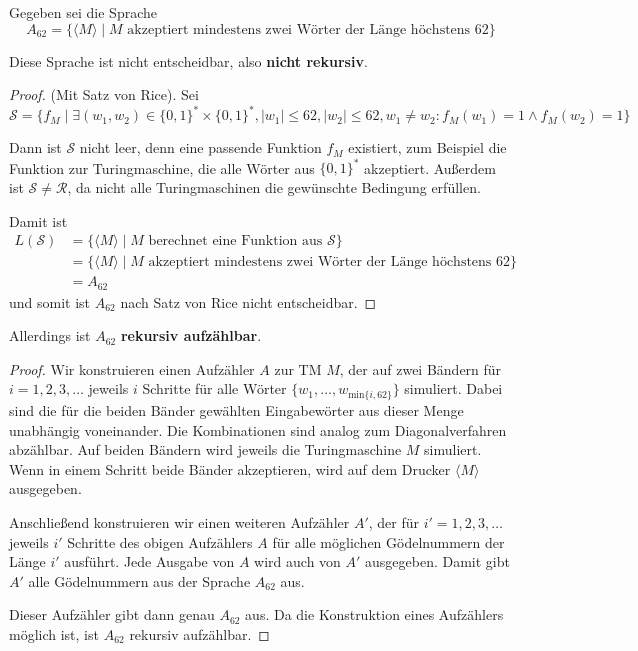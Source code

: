 Gegeben sei die Sprache
\[
A_{62} = \{\langle M \rangle \mid M \text{ akzeptiert mindestens zwei Wörter der
	Länge höchstens } 62 \}
\]

Diese Sprache ist nicht entscheidbar, also \textbf{nicht rekursiv}.

\begin{proof}
	(Mit Satz von Rice). Sei 
\[
\mathcal{S} = \{f_M \mid \exists (w_1, w_2) \in \{0,1\}^* \times \{0,1\}^*,
	|w_1| \leq 62, |w_2| \leq 62, w_1 \neq w_2 : f_M(w_1) = 1 \land f_M(w_2) = 1\}
\]

Dann ist $\mathcal{S}$ nicht leer, denn eine passende Funktion $f_M$ existiert,
zum Beispiel die Funktion zur Turingmaschine, die alle Wörter aus $\{0, 1\}^*$
akzeptiert. Außerdem ist $\mathcal{S} \neq \mathcal{R}$, da nicht alle
Turingmaschinen die gewünschte Bedingung erfüllen.

Damit ist
\begin{align*}
	L(\mathcal{S}) &= \{ \langle M \rangle \mid M
		\text{ berechnet eine Funktion aus }\mathcal{S}\} \\
	&= \{ \langle M \rangle \mid M
		\text{ akzeptiert mindestens zwei Wörter der Länge höchstens } 62 \} \\
	&= A_{62}
\end{align*}
und somit ist $A_{62}$ nach Satz von Rice nicht entscheidbar.
\end{proof}

Allerdings ist $A_{62}$ \textbf{rekursiv aufzählbar}.

\begin{proof}
Wir konstruieren einen Aufzähler $A$ zur TM $M$, der auf zwei Bändern für
$i = 1, 2, 3, \dots$ jeweils $i$ Schritte für alle Wörter
$\{w_1, \dots, w_{\text{min}\{i, 62\}}\}$ simuliert. Dabei sind die für die
beiden Bänder gewählten Eingabewörter aus dieser Menge unabhängig voneinander.
Die Kombinationen sind analog zum Diagonalverfahren abzählbar. Auf beiden
Bändern wird jeweils die Turingmaschine $M$ simuliert. Wenn in einem Schritt
beide Bänder akzeptieren, wird auf dem Drucker $\langle M \rangle$ ausgegeben.

Anschließend konstruieren wir einen weiteren Aufzähler $A'$, der für
$i' = 1, 2, 3, \dots$ jeweils $i'$ Schritte des obigen Aufzählers $A$ für alle
möglichen Gödelnummern der Länge $i'$ ausführt. Jede Ausgabe von $A$ wird auch
von $A'$ ausgegeben. Damit gibt $A'$ alle Gödelnummern aus der Sprache $A_{62}$
aus.

	Dieser Aufzähler gibt dann genau $A_{62}$ aus. Da die Konstruktion eines
	Aufzählers möglich ist, ist $A_{62}$ rekursiv aufzählbar.
\end{proof}
